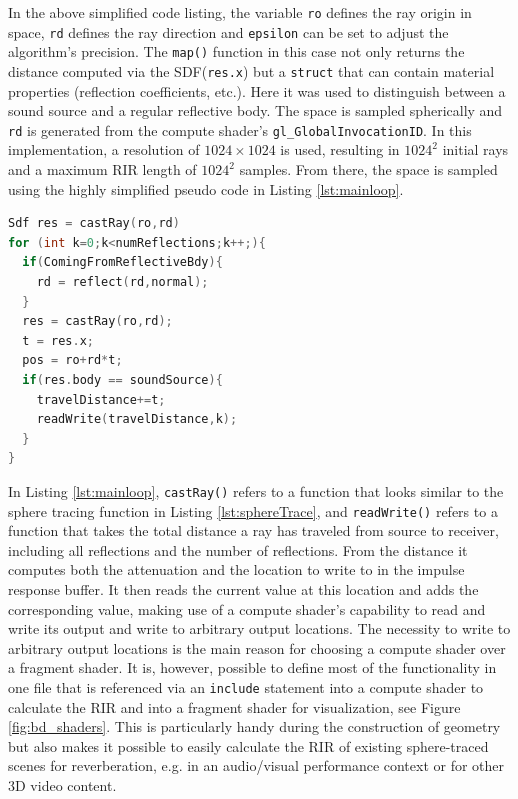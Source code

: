 \documentclass[twoside,a4paper]{article}
\begin{document}
In the above simplified code listing, the variable \texttt{ro} defines the ray origin in space, \texttt{rd} defines the ray direction and \texttt{epsilon} can be set to adjust the algorithm's precision. The \texttt{map()} function in this case not only returns the distance computed via the SDF(\texttt{res.x}) but a \texttt{struct} that can contain material properties (reflection coefficients, etc.). Here it was used to distinguish between a sound source and a regular reflective body.
The space is sampled spherically and \texttt{rd} is generated from the compute shader's \texttt{gl\_GlobalInvocationID}. In this implementation, a resolution of $1024 \times 1024$ is used, resulting in $1024^2$ initial rays and a maximum RIR length of $1024^2$ samples.
From there, the space is sampled using the highly simplified pseudo code in Listing \ref{lst:mainloop}.




\begin{lstlisting}[float,floatplacement=H, language=C, caption={\it GLSL pseudo code for sampling the space and writing to the RIR.},captionpos=b, label=lst:mainloop]
Sdf res = castRay(ro,rd)
for (int k=0;k<numReflections;k++;){
  if(ComingFromReflectiveBdy){
    rd = reflect(rd,normal);
  }
  res = castRay(ro,rd);
  t = res.x;
  pos = ro+rd*t;
  if(res.body == soundSource){
    travelDistance+=t;
    readWrite(travelDistance,k);
  }
}

\end{lstlisting}

In Listing \ref{lst:mainloop}, \texttt{castRay()} refers to a function that looks similar to the sphere tracing function in Listing \ref{lst:sphereTrace}, and \texttt{readWrite()} refers to a function that takes the total distance a ray has traveled from source to receiver, including all reflections and the number of reflections. From the distance it computes both the attenuation and the location to write to in the impulse response buffer. It then reads the current value at this location and adds the corresponding value, making use of a compute shader's capability to read and write its output and write to arbitrary output locations. The necessity to write to arbitrary output locations is the main reason for choosing a compute shader over a fragment shader. It is, however, possible to define most of the functionality in one file that is referenced via an \texttt{include} statement into a compute shader to calculate the RIR and into a fragment shader for visualization, see Figure \ref{fig:bd_shaders}. This is particularly handy during the construction of geometry but also makes it possible to easily calculate the RIR of existing sphere-traced scenes for reverberation, e.g. in an audio/visual performance context or for other 3D video content.
\end{document}
